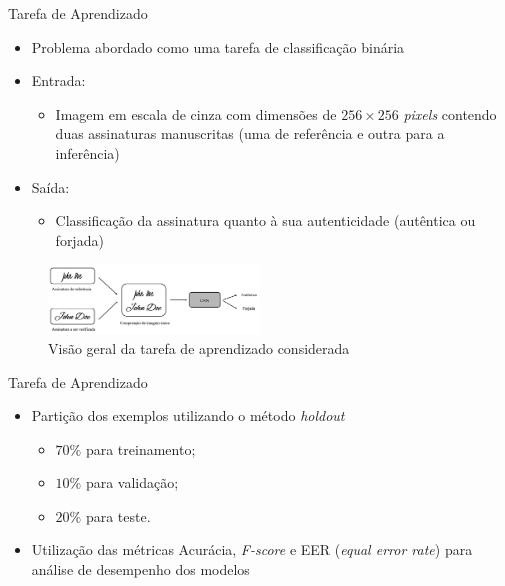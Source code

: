 
\begin{frame}{Tarefa de Aprendizado}
  \baselineskip
	\begin{itemize}
	\item Problema abordado como uma \alert{tarefa de classificação binária}
	\item \alert{Entrada:}
	\begin{itemize}
		\item Imagem em escala de cinza com dimensões de $256 \times 256$ \emph{pixels} contendo duas assinaturas manuscritas (uma de referência e outra para a inferência)
	\end{itemize}
	\item \alert{Saída:}
	\begin{itemize}
		\item Classificação da assinatura quanto à sua autenticidade (autêntica ou forjada)
	\end{itemize}
	\end{itemize}

	\begin{figure}
		\caption{Visão geral da tarefa de aprendizado considerada}
		\label{fig:esquema-solucao}
		\includegraphics[width=0.5\textwidth]{img/esquema-solucao}
	\end{figure}
\end{frame}

\begin{frame}{Tarefa de Aprendizado}

\begin{itemize}
  \item Partição dos exemplos utilizando o método \emph{holdout}
    \begin{itemize}
      \item $70\%$ para treinamento;
      \item $10\%$ para validação;
      \item $20\%$ para teste.
    \end{itemize}
  \bigskip
  \item Utilização das métricas Acurácia, \emph{F-score} e EER (\emph{equal error rate}) para análise de desempenho dos modelos
\end{itemize}

\end{frame}

